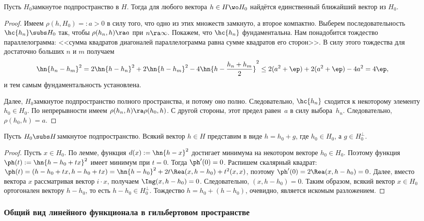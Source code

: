 \documentclass[a4paper]{article}
\begin{document}
\begin{lemma}
Пусть $H_0$\т замкнутое подпространство в $H$. Тогда для любого вектора $h \in H \wo H_0$ найдётся единственный
ближайший вектор из $H_0$.
\end{lemma}
\begin{proof}
Имеем $\rho(h, H_0) =: a > 0$ в силу того, что одно из этих множеств замкнуто, а второе компактно.
Выберем последовательность $\hc{h_n} \subs H_0$ так, чтобы $\rho(h_n,h) \ra a$ при $n \ra \infty$.
Покажем, что $\hc{h_n}$ фундаментальна.
Нам понадобится тождество параллелограмма: <<сумма квадратов диагоналей параллелограмма равна
сумме квадратов его сторон>>. В силу этого тождества для достаточно больших $n$ и $m$ получаем
$$\hn{h_n - h_m}^2 = 2\hn{h-h_n}^2 + 2\hn{h-h_m}^2 - 4\hn{h - \frac{h_n+h_m}{2}}^2 \le
2(a^2 + \ep) + 2(a^2 + \ep) - 4a^2 = 4\ep,$$
и тем самым фундаментальность установлена.

Далее, $H_0$\т замкнутое подпространство полного пространства, и потому оно полно.
Следовательно, $\hc{h_n}$ сходится к некоторому элементу $h_0 \in H_0$.
По непрерывности имеем $\rho(h_n,h) \ra \rho(h_0,h)$. С другой стороны, этот предел равен~$a$
в силу выбора~$h_n$. Следовательно, $\rho(h_0,h)=a$.
\end{proof}

\begin{imp}
Пусть $H_0 \subs H$\т замкнутое подпространство.
Всякий вектор $h \in H$ представим в виде $h = h_0 + g$, где $h_0 \in H_0$, а $g \in H_0^\bot$.
\end{imp}
\begin{proof}
Пусть $x \in H_0$. По лемме, функция $d(x) := \hn{h - x}^2$ достигает минимума на
некотором векторе $h_0 \in H_0$. Поэтому функция $\ph(t) := \hn{h - h_0 + tx}^2$
имеет минимум при $t = 0$. Тогда $\ph'(0) = 0$. Распишем скалярный квадрат:
$\ph(t) = (h - h_0 +tx, h-h_0 +tx) = \hn{h-h_0}^2 + 2t\Rea(x,h-h_0) + t^2(x,x)$,
поэтому $\ph'(0) = 2\Rea(x,h -h_0) = 0$. Далее, вместо вектора $x$ рассматривая вектор $i\cdot x$,
получаем $\Img(x,h-h_0) = 0$. Следовательно, $(x,h-h_0) = 0$.
Таким образом, всякий вектор $x \in H_0$ ортогонален вектору $h - h_0$, то есть $h-h_0 \in H_0^\bot$.
Тождество $h = h_0 + (h-h_0)$, очевидно, является искомым разложением.
\end{proof}

\subsubsection{Общий вид линейного функционала в гильбертовом пространстве}
\end{document}
